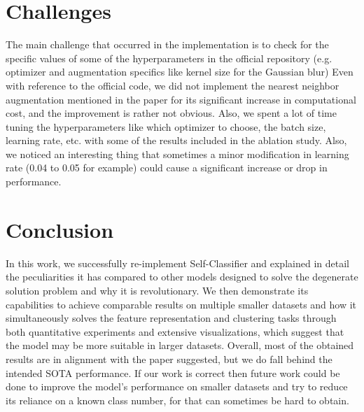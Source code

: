 \documentclass{article}
\begin{document}
\section{Challenges}
\label{sec:challenges}
The main challenge that occurred in the implementation is to check for the specific values of some of the hyperparameters in the official repository (e.g. optimizer and augmentation specifics like kernel size for the Gaussian blur) 
Even with reference to the official code, we did not implement the nearest neighbor augmentation mentioned in the paper for its significant increase in computational cost, and the improvement is rather not obvious. 
Also, we spent a lot of time tuning the hyperparameters like which optimizer to choose, the batch size, learning rate, etc. with some of the results included in the ablation study. Also, we noticed an interesting thing that sometimes a minor modification in learning rate (0.04 to 0.05 for example) could cause a significant increase or drop in performance.

    
\section{Conclusion}
\label{sec:conclusion}
In this work, we successfully re-implement Self-Classifier \cite{self_classifier} and explained in detail the peculiarities it has compared to other models designed to solve the degenerate solution problem and why it is revolutionary. We then demonstrate its capabilities to achieve comparable results on multiple smaller datasets and how it simultaneously solves the feature representation and clustering tasks through both quantitative experiments and extensive visualizations, which suggest that the model may be more suitable in larger datasets. Overall, most of the obtained results are in alignment with the paper suggested, but we do fall behind the intended SOTA performance. If our work is correct then future work could be done to improve the model's performance on smaller datasets and try to reduce its reliance on a known class number, for that can sometimes be hard to obtain.
\end{document}

